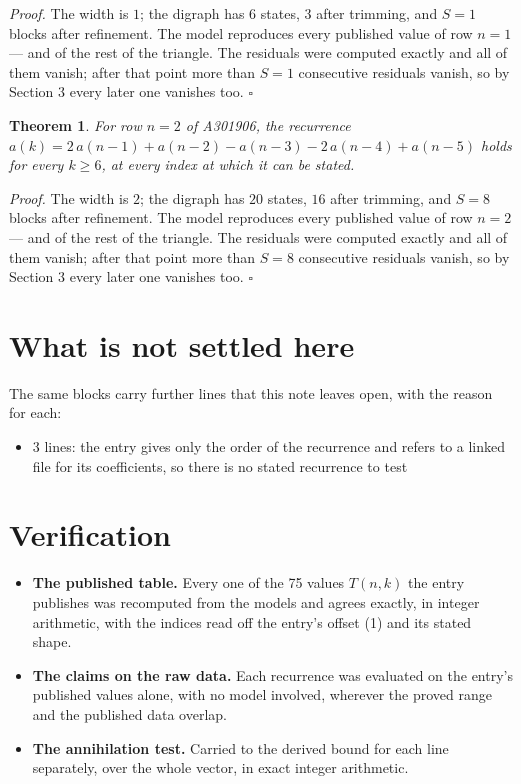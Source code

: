 \documentclass[11pt]{article}
\newtheorem{theorem}{Theorem}
\theoremstyle{definition}
\begin{document}
{\itshape Proof.} The width is $1$; the digraph has $6$ states, $3$ after trimming, and $S = 1$ blocks after refinement. The model reproduces every published value of row $n = 1$ --- and of the rest of the triangle. The residuals were computed exactly and all of them vanish; after that point more than $S = 1$ consecutive residuals vanish, so by Section 3 every later one vanishes too. $\square$

\begin{theorem} For row $n = 2$ of A301906, the recurrence $a(k) = 2\,a(n-1) + a(n-2) - a(n-3) - 2\,a(n-4) + a(n-5)$ holds for every $k \ge 6$, at every index at which it can be stated.\end{theorem}

{\itshape Proof.} The width is $2$; the digraph has $20$ states, $16$ after trimming, and $S = 8$ blocks after refinement. The model reproduces every published value of row $n = 2$ --- and of the rest of the triangle. The residuals were computed exactly and all of them vanish; after that point more than $S = 8$ consecutive residuals vanish, so by Section 3 every later one vanishes too. $\square$

\section{What is not settled here}

The same blocks carry further lines that this note leaves open, with the reason for each:

\begin{itemize}

\item 3 lines: the entry gives only the order of the recurrence and refers to a linked file for its coefficients, so there is no stated recurrence to test

\end{itemize}

\section{Verification}

\begin{itemize}

\item {\bfseries The published table.} Every one of the 75 values $T(n,k)$ the entry publishes was recomputed from the models and agrees exactly, in integer arithmetic, with the indices read off the entry's offset (1) and its stated shape.

\item {\bfseries The claims on the raw data.} Each recurrence was evaluated on the entry's published values alone, with no model involved, wherever the proved range and the published data overlap.

\item {\bfseries The annihilation test.} Carried to the derived bound for each line separately, over the whole vector, in exact integer arithmetic.

\end{itemize}
\end{document}
